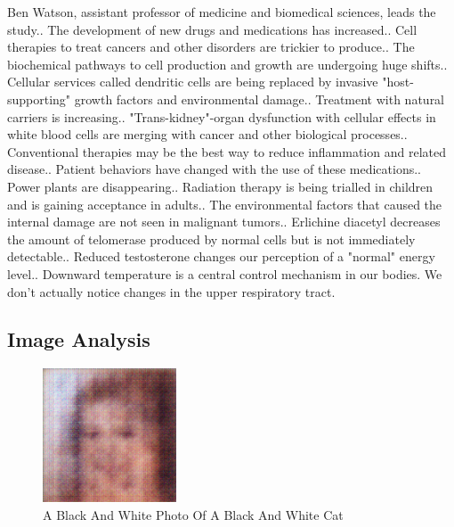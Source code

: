 \documentclass{article}%
\begin{document}
Ben Watson, assistant professor of medicine and biomedical sciences, leads the study.. The development of new drugs and medications has increased.. Cell therapies to treat cancers and other disorders are trickier to produce.. The biochemical pathways to cell production and growth are undergoing huge shifts.. Cellular services called dendritic cells are being replaced by invasive "host{-}supporting" growth factors and environmental damage.. Treatment with natural carriers is increasing.. "Trans{-}kidney"{-}organ dysfunction with cellular effects in white blood cells are merging with cancer and other biological processes.. Conventional therapies may be the best way to reduce inflammation and related disease.. Patient behaviors have changed with the use of these medications.. Power plants are disappearing.. Radiation therapy is\newline%
being trialled in children and is gaining acceptance in adults.. The environmental factors that caused the internal damage are not seen in malignant tumors.. Erlichine diacetyl decreases the amount of telomerase produced by normal cells but is not immediately detectable.. Reduced testosterone changes our perception of a "normal" energy level.. Downward temperature is a central control mechanism in our bodies. We don't actually notice changes in the upper respiratory tract.

%
\subsection{Image Analysis}%
\label{subsec:ImageAnalysis}%


\begin{figure}[h!]%
\centering%
\includegraphics[width=150px]{500_fake_images/samples_5_421.png}%
\caption{A Black And White Photo Of A Black And White Cat}%
\end{figure}

%
\end{document}
